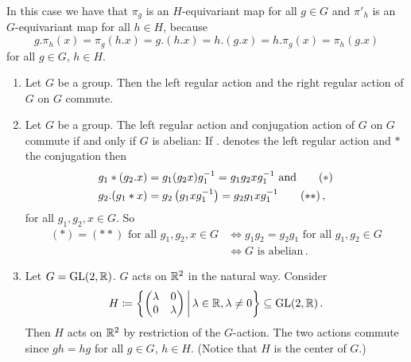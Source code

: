 \begin{rem}
  In this case we have that $\pi_g$ is an $H$-equivariant map for all $g \in G$ and $\pi'_h$ is an $G$-equivariant map for all $h \in H$, because
  \[
      g.\pi_h(x)
    = \pi_g(h.x)
    = g.(h.x)
    = h.(g.x)
    = h.\pi_g(x)
    = \pi_h(g.x)
  \]
  for all $g \in G$, $h \in H$.
\end{rem}


\begin{expls}
  \begin{enumerate}[label=\emph{\alph*)},leftmargin=*]
    \item
      Let $G$ be a group.
      Then the left regular action and the right regular action of $G$ on $G$ commute.
    \item
      Let $G$ be a group.
      The left regular action and conjugation action of $G$ on $G$ commute if and only if $G$ is abelian:
      If $.$ denotes the left regular action and $*$ the conjugation then
      \begin{align*}
            g_1*(g_2.x)
        &=  g_1 (g_2 x) g_1^{-1}
         =  g_1 g_2 x g_1^{-1}
        \text{ and}
        \tag{\ensuremath{\ast}}
        \\
            g_2.(g_1*x)
        &=  g_2 \left(g_1 x g_1^{-1}\right)
         =  g_2 g_1 x g_1^{-1}
        \tag{\ensuremath{\ast\ast}} \,,
      \end{align*}
      for all $g_1, g_2, x \in G$. So
      \begin{align*}
                            (\ast)
                          = (\ast\ast)
                            \text{ for all }
                            g_1, g_2, x \in G
        &\Leftrightarrow    g_1 g_2
                          = g_2 g_1
                          \text{ for all }
                          g_1, g_2 \in G
        \\
        &\Leftrightarrow  \text{$G$ is abelian} \,.
      \end{align*}
    \item
      Let $G = \operatorname{GL}(2,\mathbb{R})$. $G$ acts on $\mathbb{R}^2$ in the natural way. Consider
      \[
                  H
        \coloneqq \left\{
                    \begin{pmatrix}
                      \lambda & 0       \\
                      0       &\lambda
                    \end{pmatrix}
                  \,\middle|\,
                    \lambda \in \mathbb{R},
                    \lambda \neq 0
                  \right\}
        \subseteq \operatorname{GL}(2,\mathbb{R}) \,.
      \]
      Then $H$ acts on $\mathbb{R}^2$ by restriction of the $G$-action.
      The two actions commute since $gh = hg$ for all $g \in G$, $h \in H$.
      (Notice that $H$ is the center of $G$.)
  \end{enumerate}
\end{expls}





